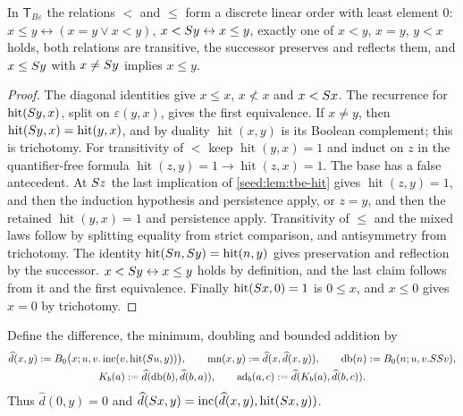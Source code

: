 \begin{lemma}[Order]\label{seed:lem:tbe-order}
In $\mathsf{T}_{B\varepsilon}$ the relations $<$ and $\leq$ form a discrete
linear order with least element $0$:
$x\leq y\leftrightarrow(x=y\lor x<y)$,
$x<S y\leftrightarrow x\leq y$, exactly one of $x<y$, $x=y$, $y<x$
holds, both relations are transitive, the successor preserves and reflects
them, and $x\leq S y$ with $x\neq S y$ implies $x\leq y$.
\end{lemma}

\begin{proof}
The diagonal identities give $x\leq x$, $x\not<x$ and $x<S x$. The
recurrence for $\operatorname{hit}(S y,x)$, split on $\varepsilon(y,x)$,
gives the first equivalence. If $x\neq y$, then
$\operatorname{hit}(S y,x)=\operatorname{hit}(y,x)$, and by duality
$\operatorname{hit}(x,y)$ is its Boolean complement; this is trichotomy. For
transitivity of $<$ keep $\operatorname{hit}(y,x)=1$ and induct on $z$ in
the quantifier-free formula
$\operatorname{hit}(z,y)=1\to\operatorname{hit}(z,x)=1$. The base has a
false antecedent. At $S z$ the last implication of
\cref{seed:lem:tbe-hit} gives $\operatorname{hit}(z,y)=1$, and then the
induction hypothesis and persistence apply, or $z=y$, and then the retained
$\operatorname{hit}(y,x)=1$ and persistence apply. Transitivity of $\leq$
and the mixed laws follow by splitting equality from strict comparison, and
antisymmetry from trichotomy. The identity
$\operatorname{hit}(S n,S y)=\operatorname{hit}(n,y)$ gives
preservation and reflection by the successor.
$x<S y\leftrightarrow x\leq y$ holds by definition, and the last claim
follows from it and the first equivalence. Finally
$\operatorname{hit}(S x,0)=1$ is $0\leq x$, and $x\leq0$ gives $x=0$ by
trichotomy.
\end{proof}

Define the difference, the minimum, doubling and bounded addition by
\begin{gather*}
 \widehat d(x,y)\mathrel{:=}
 B_0\bigl(x;u,v.\operatorname{inc}(v,\operatorname{hit}(S u,y))\bigr),
 \qquad\operatorname{mn}(x,y)\mathrel{:=}\widehat d(x,\widehat d(x,y)),\qquad
 \operatorname{db}(n)\mathrel{:=} B_0(n;u,v.SS v),\\
 K_b(a)\mathrel{:=}\widehat d(\operatorname{db}(b),\widehat d(b,a)),\qquad
 \operatorname{ad}_b(a,c)\mathrel{:=}\widehat d(K_b(a),\widehat d(b,c)).
\end{gather*}
Thus $\widehat d(0,y)=0$ and
$\widehat d(S x,y)
=\operatorname{inc}(\widehat d(x,y),\operatorname{hit}(S x,y))$.

